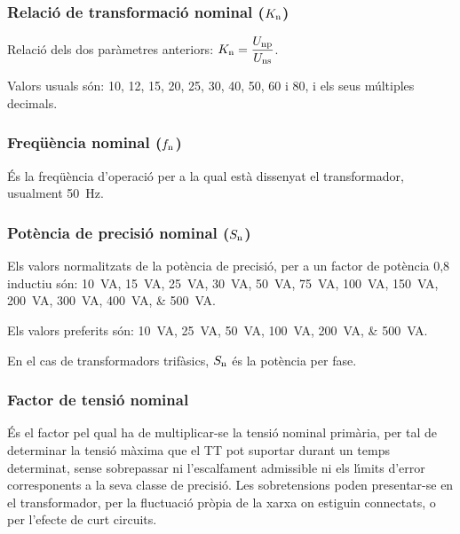 \subsubsection{Relaci\'{o} de transformaci\'{o} nominal ($K_\mathrm{n}$)}

 Relaci\'{o}  dels dos par\`{a}metres anteriors: $K_\mathrm{n} = \dfrac{U_\mathrm{np}}{U_\mathrm{ns}}$.

 Valors usuals s\'{o}n: 10, 12, 15, 20, 25, 30, 40, 50, 60 i 80, i els seus m\'{u}ltiples decimals.

\subsubsection{Freq\"{u}\`{e}ncia nominal ($f_\mathrm{n}$)}

 \'{E}s la freq\"{u}\`{e}ncia d'operaci\'{o} per a la qual  est\`{a} dissenyat el transformador, usualment \SI{50}{Hz}.

\subsubsection{Pot\`{e}ncia de precisi\'{o} nominal ($S_\mathrm{n}$)}

Els valors normalitzats de la pot\`{e}ncia de precisi\'{o}, per
a un factor de pot\`{e}ncia 0,8 inductiu s\'{o}n: \SIlist{10; 15; 25; 30; 50; 75; 100; 150;
 200; 300; 400; 500}{VA}.

 Els valors preferits s\'{o}n: \SIlist{10; 25; 50; 100; 200; 500}{VA}.

En el cas de transformadors trif\`{a}sics, $S_\mathrm{n}$ \'{e}s la pot\`{e}ncia per fase.

\subsubsection{Factor de tensi\'{o} nominal}

 \'{E}s el factor pel qual ha de
multiplicar-se la tensi\'{o} nominal prim\`{a}ria, per tal de determinar la
tensi\'{o} m\`{a}xima que el TT pot suportar durant un temps determinat,
sense sobrepassar ni l'escalfament admissible ni els l\'{\i}mits d'error
corresponents a la seva classe de precisi\'{o}. Les sobretensions poden
presentar-se en el transformador,  per la fluctuaci\'{o}
pr\`{o}pia de la xarxa on estiguin connectats, o per l'efecte de curt
circuits.

